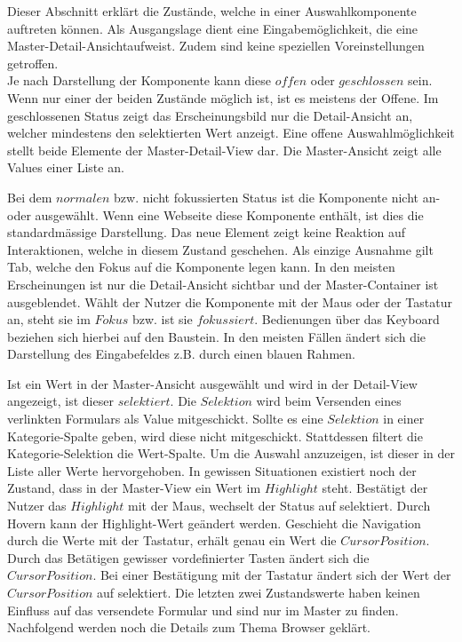 Dieser Abschnitt erklärt die Zustände, welche in einer Auswahlkomponente auftreten können.
Als Ausgangslage dient eine Eingabemöglichkeit, die eine Master-Detail-Ansicht\footnotemark aufweist.
Zudem sind keine speziellen Voreinstellungen getroffen.
\\
Je nach Darstellung der Komponente kann diese $offen$ oder $geschlossen$ sein.
Wenn nur einer der beiden Zustände möglich ist, ist es meistens der Offene.
Im geschlossenen Status zeigt das Erscheinungsbild nur die Detail-Ansicht an, welcher mindestens den selektierten Wert anzeigt.
Eine offene Auswahlmöglichkeit stellt beide Elemente der Master-Detail-View dar.
Die Master-Ansicht zeigt alle Values einer Liste an.

Bei dem $normalen$ bzw. nicht fokussierten Status ist die Komponente nicht an- oder ausgewählt.
Wenn eine Webseite diese Komponente enthält, ist dies die standardmässige Darstellung.
Das neue Element zeigt keine Reaktion auf Interaktionen, welche in diesem Zustand geschehen. 
Als einzige Ausnahme gilt Tab, welche den Fokus auf die Komponente legen kann. 
In den meisten Erscheinungen ist nur die Detail-Ansicht sichtbar und der Master-Container ist ausgeblendet.
Wählt der Nutzer die Komponente mit der Maus oder der Tastatur an, steht sie im $Fokus$ bzw. ist sie $fokussiert$.
Bedienungen über das Keyboard beziehen sich hierbei auf den Baustein.
In den meisten Fällen ändert sich die Darstellung des Eingabefeldes z.B. durch einen blauen Rahmen.

Ist ein Wert in der Master-Ansicht ausgewählt und wird in der Detail-View angezeigt, ist dieser $selektiert$.
Die $Selektion$ wird beim Versenden eines verlinkten Formulars als Value mitgeschickt.
Sollte es eine $Selektion$ in einer Kategorie-Spalte geben, wird diese nicht mitgeschickt.
Stattdessen filtert die Kategorie-Selektion die Wert-Spalte.
Um die Auswahl anzuzeigen, ist dieser in der Liste aller Werte hervorgehoben.
In gewissen Situationen existiert noch der Zustand, dass in der Master-View ein Wert im $Highlight$ steht. 
Bestätigt der Nutzer das $Highlight$ mit der Maus, wechselt der Status auf selektiert.
Durch Hovern kann der Highlight-Wert geändert werden. 
Geschieht die Navigation durch die Werte mit der Tastatur, erhält genau ein Wert die $Cursor Position$. 
Durch das Betätigen gewisser vordefinierter Tasten ändert sich die $Cursor Position$.
Bei einer Bestätigung mit der Tastatur ändert sich der Wert der $Cursor Position$ auf selektiert.
Die letzten zwei Zustandswerte haben keinen Einfluss auf das versendete Formular und sind nur im Master zu finden.
Nachfolgend werden noch die Details zum Thema Browser geklärt.


